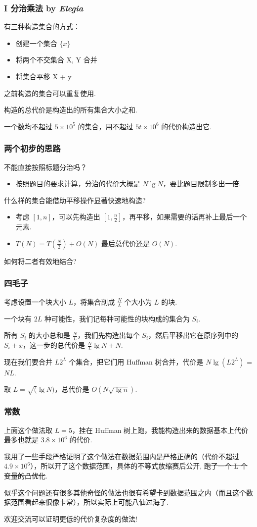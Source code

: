 \frame
{
    \frametitle{I 分治乘法 {by \itshape Elegia}}



    有三种构造集合的方式：

  \begin{itemize}
  \item 创建一个集合 $\{x\}$
  \item 将两个不交集合 X, Y 合并
  \item 将集合平移 X + y
  \end{itemize}

  之前构造的集合可以重复使用.

  构造的总代价是构造出的所有集合大小之和.

  一个数均不超过 $5 \times 10^5$ 的集合，用不超过 $5 t\times 10^6$ 的代价构造出它.

}

\frame
{
    \frametitle{两个初步的思路}

    不能直接按照标题分治吗？ \pause
    \begin{itemize}
    \item 按照题目的要求计算，分治的代价大概是 $N \lg N$，要比题目限制多出一倍. \pause
    \end{itemize}
    什么样的集合能借助平移操作显著快速地构造? \pause

    \begin{itemize}
    \item 考虑 $[1, n]$，可以先构造出 $\left[1, \frac{n}{2}\right]$，再平移，如果需要的话再补上最后一个元素.
    \item $T(N) = T\left(\frac{N}{2}\right) + O(N)$ 最后总代价还是 $O(N)$. \pause
    \end{itemize}
    如何将二者有效地结合?

}

\frame
{
    \frametitle{四毛子}

    考虑设置一个块大小 $L$，将集合剖成 $\frac{N}{L}$ 个大小为 $L$ 的块.

    一个块有 $2L$ 种可能性，我们记每种可能性的块构成的集合为 $S_i$. \pause

    所有 $S_i$ 的大小总和是 $\frac{N}{L}$，我们先构造出每个 $S_i$，然后平移出它在原序列中的 $S_i+x$，这一步的总代价是 $\frac{N}{L}\lg N + N$. \pause

    现在我们要合并 $L2^L$ 个集合，把它们用 Huffman 树合并，代价是 $N \lg (L2^L)$ = $NL$. \pause

    取 $L=\sqrt(\lg ⁡N)$，总代价是 $O(N\sqrt{\lg n})$.
}

\frame
{
	\frametitle{常数}

	上面这个做法取 $L=5$，挂在 Huffman 树上跑，我能构造出来的数据基本上代价最多也就是 $3.8 \times 10^6$ 的代价.

	我用了一些手段严格证明了这个做法在数据范围内是严格正确的（代价不超过 $4.9 \times 10^6$），所以开了这个数据范围，具体的不等式放缩赛后公开, \sout{跑了一个 L 个变量的凸优化}. \pause

	似乎这个问题还有很多其他奇怪的做法也很有希望卡到数据范围之内（而且这个数据范围看起来很像卡常），所以实际上可能八仙过海了.

	欢迎交流可以证明更低的代价复杂度的做法!


}